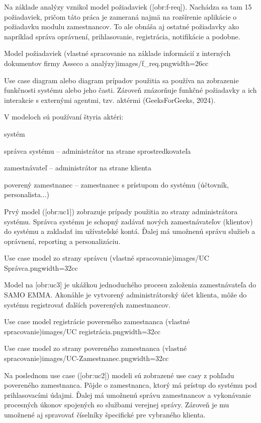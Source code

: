 Na základe analýzy vznikol model požiadaviek ([obr:f-req]). Nachádza sa tam 15 požiadaviek, pričom táto práca je zameraná najmä na rozšírenie aplikácie o požiadavku modulu zamestnancov. To ale obnáša aj ostatné požiadavky ako napríklad správa oprávnení, prihlasovanie, registrácia, notifikácie a podobne.

{Model požiadaviek (vlastné spracovanie na základe informácií z interných dokumentov firmy Asseco a analýzy)}{images/f_req.png}{width=26cc}


Use case diagram alebo diagram prípadov použitia sa používa na zobrazenie funkčnosti systému alebo jeho časti. Zároveň znázorňuje funkčné požiadavky a ich interakcie s externými agentmi, tzv. aktérmi \scr(GeeksForGeeks, 2024).

V modeloch sú používaní štyria aktéri:

\startitemize
\item{systém}
\item{správca systému -- administrátor na strane sprostredkovateľa}
\item{zamestnávateľ -- administrátor na strane klienta}
\item{poverený zamestnanec -- zamestnanec s prístupom do systému (účtovník, personalista...)}
\stopitemize 

Prvý model ([obr:uc1]) zobrazuje prípady použitia zo strany administrátora systému.  Správca systému je schopný zadávať nových zamestnávateľov (klientov) do systému a zakladať im užívateľské kontá. Ďalej má umožnenú správu služieb a oprávnení, reporting a personalizáciu.

{Use case model zo strany správcu (vlastné spracovanie)}{images/UC Správca.png}{width=32cc}

Model na [obr:uc3] je ukážkou jednoduchého procesu založenia zamestnávateľa do SAMO EMMA. Akonáhle je vytvorený administrátorský účet klienta, môže do systému registrovať ďalších poverených zamestnancov.

{Use case model registrácie povereného zamestnanca (vlastné spracovanie)}{images/UC registrácia.png}{width=32cc}

{Use case model zo strany povereného zamestnanca (vlastné spracovanie)}{images/UC-Zamestnanec.png}{width=32cc}

Na poslednom use case ([obr:uc2]) modeli sú zobrazené use casy z pohľadu povereného zamestnanca. Pôjde o zamestnanca, ktorý má prístup do systému pod prihlasovacími údajmi. Ďalej má umožnenú správu zamestnancov a vykonávanie procesných úkonov spojených so službami verejnej správy. Zároveň je mu umožnené aj spravovať číselníky špecifické pre vybraného klienta.

